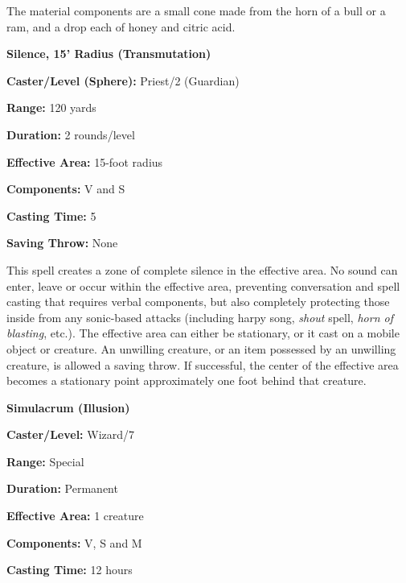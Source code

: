 \begin{multicols}{2}
The material components are a small cone made from the horn of a bull or a ram, and a drop each of honey and citric acid.

\vspace{1em}

\noindent
\begin{minipage}{\columnwidth}

\noindent \textbf{Silence, 15' Radius (Transmutation)}

\noindent \textbf{Caster/Level (Sphere):} Priest/2 (Guardian)

\noindent \textbf{Range:} 120 yards

\noindent \textbf{Duration:} 2 rounds/level

\noindent \textbf{Effective Area:} 15-foot radius

\noindent \textbf{Components:} V and S

\noindent \textbf{Casting Time:} 5

\noindent \textbf{Saving Throw:} None

\end{minipage}

This spell creates a zone of complete silence in the effective area.  No sound can enter, leave or occur within the effective area, preventing conversation and spell casting that requires verbal components, but also completely protecting those inside from any sonic-based attacks (including harpy song, \textit{shout} spell, \textit{horn of blasting}, etc.).  The effective area can either be stationary, or it cast on a mobile object or creature.  An unwilling creature, or an item possessed by an unwilling creature, is allowed a saving throw.  If successful, the center of the effective area becomes a stationary point approximately one foot behind that creature.  

\vspace{1em}

\noindent
\begin{minipage}{\columnwidth}

\noindent \textbf{Simulacrum (Illusion)}

\noindent \textbf{Caster/Level:} Wizard/7

\noindent \textbf{Range:} Special

\noindent \textbf{Duration:} Permanent

\noindent \textbf{Effective Area:} 1 creature

\noindent \textbf{Components:} V, S and M

\noindent \textbf{Casting Time:} 12 hours


\end{minipage}
\end{multicols}
